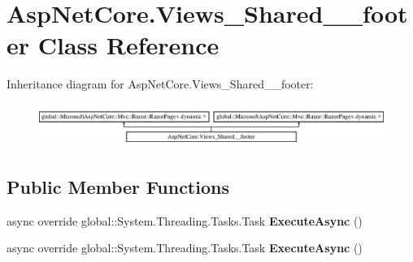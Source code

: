 \hypertarget{class_asp_net_core_1_1_views___shared____footer}{}\section{Asp\+Net\+Core.\+Views\+\_\+\+Shared\+\_\+\+\_\+footer Class Reference}
\label{class_asp_net_core_1_1_views___shared____footer}
Inheritance diagram for Asp\+Net\+Core.\+Views\+\_\+\+Shared\+\_\+\+\_\+footer\+:\begin{figure}[H]
\begin{center}
\leavevmode
\includegraphics[height=1.432225cm]{class_asp_net_core_1_1_views___shared____footer}
\end{center}
\end{figure}
\subsection*{Public Member Functions}
\begin{DoxyCompactItemize}
\item 
\mbox{\label{class_asp_net_core_1_1_views___shared____footer_a343d3ae315cf4e5f3cc77b0bb74c1752}} 
async override global\+::\+System.\+Threading.\+Tasks.\+Task {\bfseries Execute\+Async} ()
\item 
\mbox{\label{class_asp_net_core_1_1_views___shared____footer_a343d3ae315cf4e5f3cc77b0bb74c1752}} 
async override global\+::\+System.\+Threading.\+Tasks.\+Task {\bfseries Execute\+Async} ()
\end{DoxyCompactItemize}

